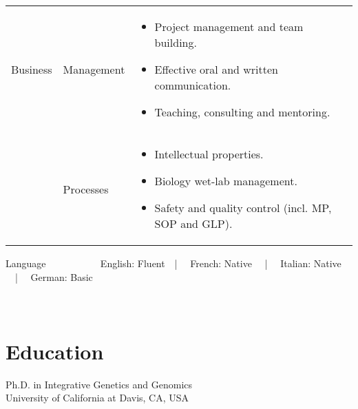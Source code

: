 \documentclass{CV}
\begin{document}
\begin{tabular}{p{} p{} p{}}
Business & 
	Management &
		\begin{itemize}\setlength\itemsep{-0.5em}
		\vspace{-1.8em}
		\item Project management and team building.
		\item Effective oral and written communication.
		\item Teaching, consulting and mentoring.
		\end{itemize}\\
& 
	Processes &
		\begin{itemize}\setlength\itemsep{-0.5em}
		\vspace{-1.8em}
		\item Intellectual properties.
		\item Biology wet-lab management.
		\item Safety and quality control (incl. MP, SOP and GLP).
		\end{itemize}\\
\end{tabular}
Language ~~~~~~~~~~ English: Fluent~~|~~ French: Native ~~|~~ Italian: Native ~~|~~ German: Basic\\
\\\\






\section*{Education}
Ph.D. in  Integrative Genetics and Genomics  \hfill {}\\
University of California at Davis, CA, USA\\

\end{document}
